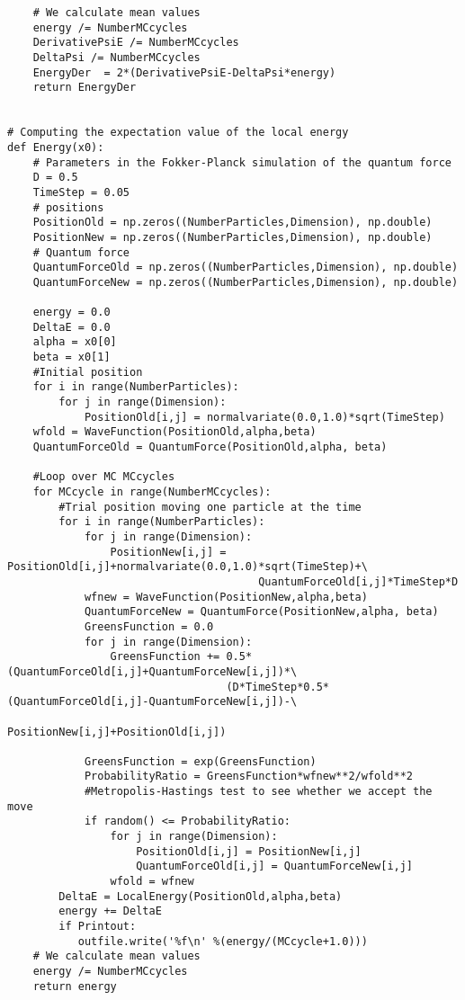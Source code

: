 \documentclass[%
oneside,                 %
final,                   %
10pt]{article}
\begin{document}
\begin{verbatim}
    # We calculate mean values
    energy /= NumberMCcycles
    DerivativePsiE /= NumberMCcycles
    DeltaPsi /= NumberMCcycles
    EnergyDer  = 2*(DerivativePsiE-DeltaPsi*energy)
    return EnergyDer


# Computing the expectation value of the local energy 
def Energy(x0):
    # Parameters in the Fokker-Planck simulation of the quantum force
    D = 0.5
    TimeStep = 0.05
    # positions
    PositionOld = np.zeros((NumberParticles,Dimension), np.double)
    PositionNew = np.zeros((NumberParticles,Dimension), np.double)
    # Quantum force
    QuantumForceOld = np.zeros((NumberParticles,Dimension), np.double)
    QuantumForceNew = np.zeros((NumberParticles,Dimension), np.double)

    energy = 0.0
    DeltaE = 0.0
    alpha = x0[0]
    beta = x0[1]
    #Initial position
    for i in range(NumberParticles):
        for j in range(Dimension):
            PositionOld[i,j] = normalvariate(0.0,1.0)*sqrt(TimeStep)
    wfold = WaveFunction(PositionOld,alpha,beta)
    QuantumForceOld = QuantumForce(PositionOld,alpha, beta)

    #Loop over MC MCcycles
    for MCcycle in range(NumberMCcycles):
        #Trial position moving one particle at the time
        for i in range(NumberParticles):
            for j in range(Dimension):
                PositionNew[i,j] = PositionOld[i,j]+normalvariate(0.0,1.0)*sqrt(TimeStep)+\
                                       QuantumForceOld[i,j]*TimeStep*D
            wfnew = WaveFunction(PositionNew,alpha,beta)
            QuantumForceNew = QuantumForce(PositionNew,alpha, beta)
            GreensFunction = 0.0
            for j in range(Dimension):
                GreensFunction += 0.5*(QuantumForceOld[i,j]+QuantumForceNew[i,j])*\
	                              (D*TimeStep*0.5*(QuantumForceOld[i,j]-QuantumForceNew[i,j])-\
                                      PositionNew[i,j]+PositionOld[i,j])
      
            GreensFunction = exp(GreensFunction)
            ProbabilityRatio = GreensFunction*wfnew**2/wfold**2
            #Metropolis-Hastings test to see whether we accept the move
            if random() <= ProbabilityRatio:
                for j in range(Dimension):
                    PositionOld[i,j] = PositionNew[i,j]
                    QuantumForceOld[i,j] = QuantumForceNew[i,j]
                wfold = wfnew
        DeltaE = LocalEnergy(PositionOld,alpha,beta)
        energy += DeltaE
        if Printout: 
           outfile.write('%f\n' %(energy/(MCcycle+1.0)))            
    # We calculate mean values
    energy /= NumberMCcycles
    return energy


\end{verbatim}
\end{document}
